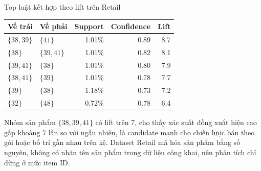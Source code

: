 \documentclass[9pt, aspectratio=169]{beamer}
\begin{document}
\begin{frame}{Top luật kết hợp theo lift trên Retail}
  \small
  \centering
  \begin{tabular}{@{}llrrr@{}}
    \toprule
    Vế trái & Vế phải & Support & Confidence & Lift \\
    \midrule
    $\{38,39\}$ & $\{41\}$     & 1.01\% & 0.89 & 8.7 \\
    $\{38\}$    & $\{39,41\}$  & 1.01\% & 0.82 & 8.1 \\
    $\{39,41\}$ & $\{38\}$     & 1.01\% & 0.80 & 7.9 \\
    $\{38,41\}$ & $\{39\}$     & 1.01\% & 0.78 & 7.7 \\
    $\{39\}$    & $\{38\}$     & 1.18\% & 0.73 & 7.2 \\
    $\{32\}$    & $\{48\}$     & 0.72\% & 0.78 & 6.4 \\
    \bottomrule
  \end{tabular}

  \vspace{0.25cm}
  \raggedright
  Nhóm sản phẩm $\{38,39,41\}$ có lift trên 7, cho thấy xác suất đồng xuất
  hiện cao gấp khoảng 7 lần so với ngẫu nhiên, là candidate mạnh cho chiến
  lược bán theo gói hoặc bố trí gần nhau trên kệ. Dataset Retail mã hóa sản
  phẩm bằng số nguyên, không có nhãn tên sản phẩm trong dữ liệu công khai,
  nên phân tích chỉ dừng ở mức item ID.
\end{frame}

\end{document}

